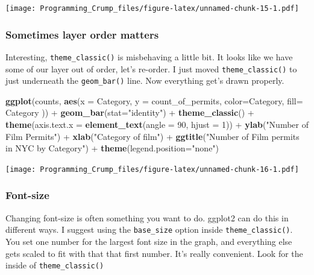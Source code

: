 \documentclass[]{book}
\newenvironment{Shaded}{\begin{snugshade}}{\end{snugshade}}
\newcommand{\KeywordTok}[1]{\textcolor[rgb]{0.13,0.29,0.53}{\textbf{{#1}}}}
\newcommand{\DataTypeTok}[1]{\textcolor[rgb]{0.13,0.29,0.53}{{#1}}}
\newcommand{\DecValTok}[1]{\textcolor[rgb]{0.00,0.00,0.81}{{#1}}}
\newcommand{\StringTok}[1]{\textcolor[rgb]{0.31,0.60,0.02}{{#1}}}
\newcommand{\NormalTok}[1]{{#1}}
\theoremstyle{definition}
\theoremstyle{definition}
\theoremstyle{definition}
\theoremstyle{remark}
\begin{document}
\texttt{[image: Programming\_Crump\_files/figure-latex/unnamed-chunk-15-1.pdf]}

\subsubsection{Sometimes layer order
matters}\label{sometimes-layer-order-matters}

Interesting, \texttt{theme\_classic()} is misbehaving a little bit. It
looks like we have some of our layer out of order, let's re-order. I
just moved \texttt{theme\_classic()} to just underneath the
\texttt{geom\_bar()} line. Now everything get's drawn properly.

\begin{Shaded}
\begin{Highlighting}[]
\KeywordTok{ggplot}\NormalTok{(counts, }\KeywordTok{aes}\NormalTok{(}\DataTypeTok{x =} \NormalTok{Category, }\DataTypeTok{y =} \NormalTok{count_of_permits, }
                   \DataTypeTok{color=}\NormalTok{Category, }
                   \DataTypeTok{fill=} \NormalTok{Category )) +}
\StringTok{  }\KeywordTok{geom_bar}\NormalTok{(}\DataTypeTok{stat=}\StringTok{"identity"}\NormalTok{) +}\StringTok{ }
\StringTok{  }\KeywordTok{theme_classic}\NormalTok{() +}
\StringTok{  }\KeywordTok{theme}\NormalTok{(}\DataTypeTok{axis.text.x =} \KeywordTok{element_text}\NormalTok{(}\DataTypeTok{angle =} \DecValTok{90}\NormalTok{, }\DataTypeTok{hjust =} \DecValTok{1}\NormalTok{)) +}
\StringTok{  }\KeywordTok{ylab}\NormalTok{(}\StringTok{"Number of Film Permits"}\NormalTok{) +}\StringTok{ }
\StringTok{  }\KeywordTok{xlab}\NormalTok{(}\StringTok{"Category of film"}\NormalTok{) +}
\StringTok{  }\KeywordTok{ggtitle}\NormalTok{(}\StringTok{"Number of Film permits in NYC by Category"}\NormalTok{) +}
\StringTok{  }\KeywordTok{theme}\NormalTok{(}\DataTypeTok{legend.position=}\StringTok{"none"}\NormalTok{) }
\end{Highlighting}
\end{Shaded}

\texttt{[image: Programming\_Crump\_files/figure-latex/unnamed-chunk-16-1.pdf]}

\subsubsection{Font-size}\label{font-size}

Changing font-size is often something you want to do. ggplot2 can do
this in different ways. I suggest using the \texttt{base\_size} option
inside \texttt{theme\_classic()}. You set one number for the largest
font size in the graph, and everything else gets scaled to fit with that
that first number. It's really convenient. Look for the inside of
\texttt{theme\_classic()}
\end{document}
